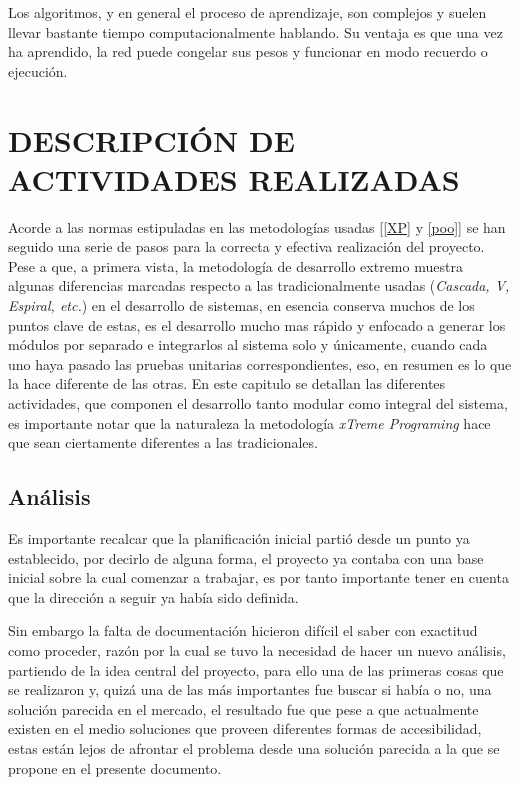 \documentclass[12pt]{book} %
\begin{document}
		Los algoritmos, y en general el proceso de aprendizaje, son complejos y suelen llevar bastante tiempo computacionalmente hablando. 
		Su ventaja es que una vez ha aprendido, la red puede congelar sus pesos y funcionar en modo recuerdo o ejecución.
		 
		 		


\chapter{DESCRIPCIÓN DE ACTIVIDADES REALIZADAS}
\thispagestyle{empty}
\newpage

	Acorde a las normas estipuladas en las metodologías usadas [\ref{XP} y \ref{poo}] se han seguido una serie de pasos para la correcta 
	y efectiva realización del proyecto. Pese a que, a primera vista, la metodología de desarrollo extremo muestra algunas diferencias marcadas 
	respecto a las tradicionalmente usadas (\textit{Cascada, V, Espiral, etc.}) en el desarrollo de sistemas, en esencia conserva muchos de 
	los puntos clave de estas, es el desarrollo mucho mas rápido y enfocado a generar los módulos por separado e
	integrarlos al sistema solo y únicamente, cuando cada uno haya pasado las pruebas unitarias correspondientes, eso, en resumen es lo que 
	la hace diferente de las otras.
	En este capitulo se detallan las diferentes actividades, que componen el desarrollo tanto modular como integral del sistema, es importante 
	notar que la naturaleza la metodología \textit{xTreme Programing} hace que sean ciertamente diferentes a las tradicionales.
\section{Análisis}
	Es importante recalcar que la planificación inicial partió desde un punto ya establecido, por decirlo de alguna forma, el proyecto ya contaba
	con una base inicial sobre la cual comenzar a trabajar, es por tanto importante tener en cuenta que la dirección a seguir ya había sido definida.
	
	Sin embargo la falta de documentación hicieron difícil el saber con exactitud como proceder, razón por la cual se tuvo la necesidad de hacer 
	un nuevo análisis, partiendo de la idea central del proyecto, para ello una de las primeras cosas que se realizaron y, quizá una de las más
	importantes fue buscar si había o no, una solución parecida en el mercado, el resultado fue que pese a que actualmente existen en el medio
	soluciones que proveen diferentes formas de accesibilidad, estas están lejos de afrontar el problema desde una solución parecida a la que se 
	propone en el presente documento.
	
\end{document}
